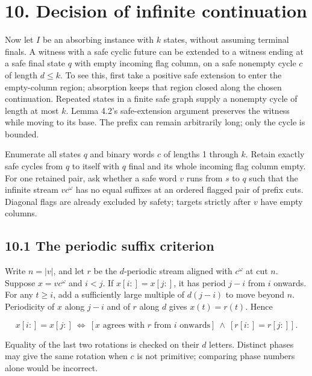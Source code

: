 \documentclass[
  11pt,
  a4paper,
]{article}
\newcounter{none} %
\begin{document}

\section{10. Decision of infinite
continuation}\label{decision-of-infinite-continuation}

Now let \(I\) be an absorbing instance with \(k\) states, without
assuming terminal finals. A witness with a safe cyclic future can be
extended to a witness ending at a safe final state \(q\) with empty
incoming flag column, on a safe nonempty cycle \(c\) of length
\(d\le k\). To see this, first take a positive safe extension to enter
the empty-column region; absorption keeps that region closed along the
chosen continuation. Repeated states in a finite safe graph supply a
nonempty cycle of length at most \(k\). Lemma 4.2's safe-extension
argument preserves the witness while moving to its base. The prefix can
remain arbitrarily long; only the cycle is bounded.

Enumerate all states \(q\) and binary words \(c\) of lengths 1 through
\(k\). Retain exactly safe cycles from \(q\) to itself with \(q\) final
and its whole incoming flag column empty. For one retained pair, ask
whether a safe word \(v\) runs from \(s\) to \(q\) such that the
infinite stream \(v c^\omega\) has no equal suffixes at an ordered
flagged pair of prefix cuts. Diagonal flags are already excluded by
safety; targets strictly after \(v\) have empty columns.

\subsection{10.1 The periodic suffix
criterion}\label{the-periodic-suffix-criterion}

Write \(n=|v|\), and let \(r\) be the \(d\)-periodic stream aligned with
\(c^\omega\) at cut \(n\). Suppose \(x=v c^\omega\) and \(i<j\). If
\(x[i:]=x[j:]\), it has period \(j-i\) from \(i\) onwards. For any
\(t\ge i\), add a sufficiently large multiple of \(d(j-i)\) to move
beyond \(n\). Periodicity of \(x\) along \(j-i\) and of \(r\) along
\(d\) gives \(x(t)=r(t)\). Hence

\[x[i:]=x[j:]
\ \Longleftrightarrow\
[x\text{ agrees with }r\text{ from }i\text{ onwards}]
\ \land\ [r[i:]=r[j:]].\tag{10.1}\]

Equality of the last two rotations is checked on their \(d\) letters.
Distinct phases may give the same rotation when \(c\) is not primitive;
comparing phase numbers alone would be incorrect.
\end{document}
